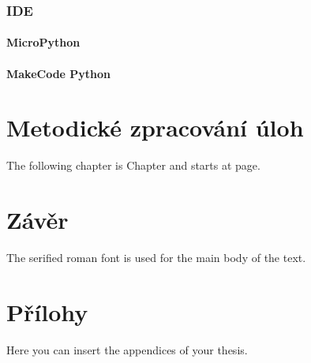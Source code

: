 \documentclass[
  digital,     %
  oneside,     %
  nosansbold,  %
  nocolorbold, %
  lof,         %
  lot,         %
]{fithesis4}
\begin{document}
\subsection{IDE}

\subsubsection{MicroPython}

\subsubsection{MakeCode Python}


\chapter{Metodické zpracování úloh}
The following chapter is Chapter and starts at page.


\chapter{Závěr}
The serified roman font is used for the main body of the text.


\printbibliography[heading=bibintoc] %

\makeatletter\thesis@blocks@clear\makeatother
{} %
\printindex

\appendix %


\chapter{Přílohy}
Here you can insert the appendices of your thesis.
\end{document}
